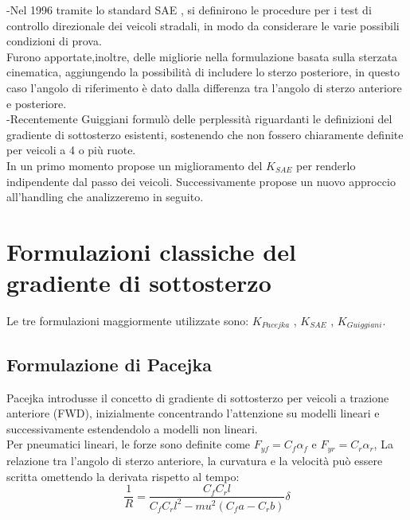 -Nel 1996 tramite lo standard SAE \cite{J266_201811}, si definirono le procedure per i test di controllo direzionale dei veicoli stradali, in modo da considerare le varie possibili condizioni di prova. \\
Furono apportate,inoltre, delle migliorie nella formulazione basata sulla sterzata cinematica, aggiungendo la possibilità di includere lo sterzo posteriore, in questo caso l'angolo di riferimento è dato dalla differenza tra l'angolo di sterzo anteriore e posteriore.\\
-Recentemente Guiggiani formulò delle perplessità riguardanti le definizioni del gradiente di sottosterzo esistenti, sostenendo che non fossero chiaramente definite per veicoli a 4 o più ruote.\\
In un primo momento propose un miglioramento del $K_{SAE}$ per renderlo indipendente dal passo dei veicoli.
Successivamente propose un nuovo approccio all'handling che analizzeremo in seguito.
\section{Formulazioni classiche del gradiente di sottosterzo}
Le tre formulazioni maggiormente utilizzate sono: $K_{Pacejka}$ , $K_{SAE}$ , $K_{Guiggiani}$.
\subsection{Formulazione di Pacejka}
Pacejka introdusse il concetto di gradiente di sottosterzo per veicoli a trazione anteriore (FWD), inizialmente concentrando l'attenzione su modelli lineari e successivamente estendendolo a modelli non lineari.\\
Per pneumatici lineari, le forze sono definite come $F_{yf} = C_f \alpha_f$ e $F_{yr} = C_r \alpha_r$, 
La relazione tra l'angolo di sterzo anteriore, la curvatura e la velocità può essere scritta omettendo la derivata rispetto
al tempo:\\
\begin{equation} \label{7}
\frac{1}{R} = \frac{ C_f C_r l}{C_f C_r l^2 - mu^2(C_f a - C_rb)} \delta
\end{equation}

